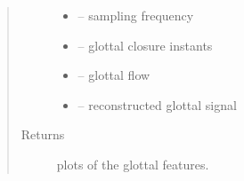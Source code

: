 \documentclass[letterpaper,10pt,english]{sphinxmanual}
\begin{document}
\begin{fulllineitems}
\begin{fulllineitems}
\begin{quote}
\begin{description}
\begin{itemize}
\item {} 
 -- sampling frequency

\item {} 
 -- glottal closure instants

\item {} 
 -- glottal flow

\item {} 
 -- reconstructed glottal signal

\end{itemize}

\item[{Returns}] \leavevmode
plots of the glottal features.

\end{description}\end{quote}

\end{fulllineitems}


\end{fulllineitems}

\end{document}
